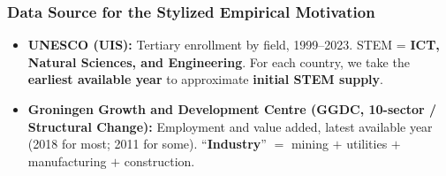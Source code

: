 \documentclass[9pt,xcolor={svgnames}]{beamer}
\begin{document}
\begin{frame}\label{app:datasource}
\frametitle{Data Source for the Stylized Empirical Motivation}
\begin{itemize}

\item \textbf{UNESCO (UIS):} Tertiary enrollment by field, 1999–2023. 
STEM = \textbf{ICT, Natural Sciences, and Engineering}.  
For each country, we take the \textbf{earliest available year} to approximate \textbf{initial STEM supply}.

\medskip

\item \textbf{Groningen Growth and Development Centre (GGDC, 10-sector / Structural Change):} 
Employment and value added, latest available year (2018 for most; 2011 for some).  
“\textbf{Industry}” $=$ mining $+$ utilities $+$ manufacturing $+$ construction.

\end{itemize}

\hyperlink{main:scatterplot}{}

\end{frame}
\end{document}
